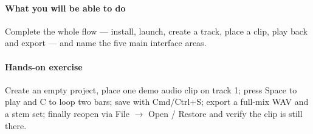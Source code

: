 \paragraph{What you will be able to do} Complete the whole flow — install, launch, create a track, place a clip, play back and export — and name the five main interface areas.

\paragraph{Hands-on exercise} Create an empty project, place one demo audio clip on track 1; press Space to play and C to loop two bars; save with Cmd/Ctrl+S; export a full-mix WAV and a stem set; finally reopen via File $\to$ Open / Restore and verify the clip is still there.
